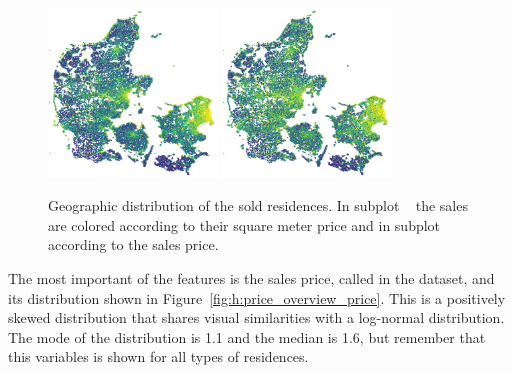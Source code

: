 \begin{figure}
  \centering
  \subfloat[\label{fig:h:geo_overview_sqm_price}]{\qquad}
  \includegraphics[draft, width=0.4\textwidth]{figures/housing/Denmark_Overview_SqmPrice.png}\hfil
  \subfloat[\label{fig:h:geo_overview_sales_price}]{\qquad}
  \includegraphics[draft, width=0.4\textwidth]{figures/housing/Denmark_Overview_SalesPrice.png}
  \caption[Distributions for the housing price dataset]{Geographic distribution of the sold residences. 
           In subplot ~\protect{} the sales are colored according to their square meter price and in subplot ~\protect{} according to the sales price. 
           }
  \label{fig:h:geo_overview}
  \vspace{\abovecaptionskip}
\end{figure}


The most important of the features is the sales price, called  in the dataset, and its distribution shown in Figure~\ref{fig:h:price_overview_price}. This is a positively skewed distribution that shares visual similarities with a log-normal distribution. The mode of the distribution is \SI{1.1}{\Mkr} and the median is \SI{1.6}{\Mkr}, but remember that this variables is shown for all types of residences.  


